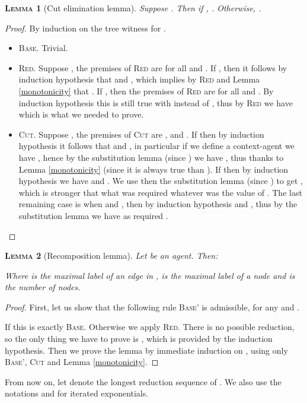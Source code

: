 \documentclass{article}
\newtheorem{lemma}{\textsc{Lemma}}
\begin{document}
\begin{lemma}[Cut elimination lemma]
Suppose . Then if , . Otherwise, .
\end{lemma}
\begin{proof}
By induction on the tree witness for .
\begin{itemize}
\item \textsc{Base.} Trivial.
\item \textsc{Red.} Suppose , the premises of \textsc{Red} are
 for all  and .
If , then it follows by induction hypothesis that  and
, which implies by \textsc{Red} and Lemma \ref{monotonicity} that . If , then
the premises of \textsc{Red} are  for all  and . By induction
hypothesis this is still true with  instead of , thus by \textsc{Red} we have  which is what we needed to prove.
\item \textsc{Cut.} Suppose , the premises of \textsc{Cut} are ,  and . If 
then by induction hypothesis it follows that  and , in particular if we define a context-agent  we have
, hence by the substitution lemma (since ) we have
, thus  thanks to Lemma \ref{monotonicity} (since it is always true
than ).
If  then by induction hypothesis we have  and . We use then the substitution lemma (since ) to get , which
is stronger that what was required whatever was the value of . The last remaining case is when  and , then by induction hypothesis  and ,
thus by the substitution lemma we have as required .
\end{itemize}
\end{proof}

\begin{lemma}[Recomposition lemma]
Let  be an agent. Then:

Where  is the maximal label of an edge in ,  is the maximal label of a node and  is the number of nodes.
\end{lemma}
\begin{proof}
First, let us show that the following rule \textsc{Base'} is admissible, for any  and .

If  this is exactly \textsc{Base}. Otherwise we apply \textsc{Red}. There is no possible reduction, so the only thing we have to prove is , which
is provided by the induction hypothesis. Then we prove the lemma by immediate induction on , using only \textsc{Base'}, \textsc{Cut} and Lemma \ref{monotonicity}.
\end{proof}

From now on, let  denote the longest reduction sequence of . We also use the notations  and  for iterated exponentials.
\end{document}
